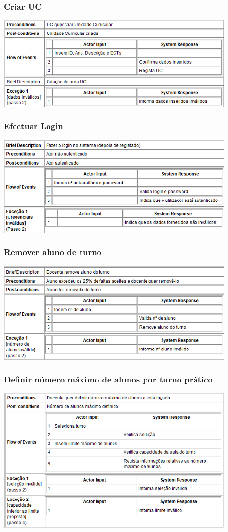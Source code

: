 \documentclass[a4paper]{article}
\begin{document}
\subsubsection{Criar UC}
\includegraphics[width=12cm]{criaruc}\break

\subsubsection{Efectuar Login}
\includegraphics[width=12cm]{efectuarlogin}\break

\subsubsection{Remover aluno de turno}
\includegraphics[width=12cm]{removeralunoturno}\break

\subsubsection{Definir número máximo de alunos por turno prático}
\includegraphics[width=12cm]{definiralunos}\break
\end{document}
